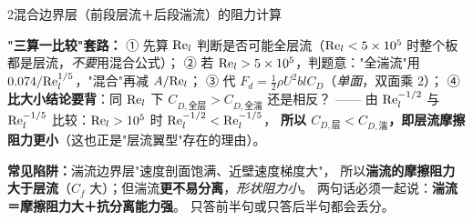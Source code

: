 \begin{kaodian}{2}{混合边界层（前段层流＋后段湍流）的阻力计算}
\begin{banfa}
\textbf{"三算一比较"套路：}
① 先算 $\mathrm{Re}_l$ 判断是否可能全层流（$\mathrm{Re}_l<5\times10^5$ 时整个板都是层流，\emph{不要}用混合公式）；
② 若 $\mathrm{Re}_l>5\times10^5$，判题意："全湍流"用 $0.074/\mathrm{Re}_l^{1/5}$，"混合"再减 $A/\mathrm{Re}_l$；
③ 代 $F_d=\frac12\rho U^2blC_D$（\emph{单面}，双面乘 2）；
④ \textbf{比大小结论要背}：同 $\mathrm{Re}_l$ 下 $C_{D,\text{全层}}>C_{D,\text{全湍}}$ 还是相反？
—— 由 $\mathrm{Re}_l^{-1/2}$ 与 $\mathrm{Re}_l^{-1/5}$ 比较：$\mathrm{Re}_l>10^5$ 时 $\mathrm{Re}_l^{-1/2}<\mathrm{Re}_l^{-1/5}$，
\textbf{所以 $C_{D,\text{层}}<C_{D,\text{湍}}$，即层流摩擦阻力更小}（这也正是"层流翼型"存在的理由）。
\end{banfa}

\begin{yicuo}
\textbf{常见陷阱：}湍流边界层"速度剖面饱满、近壁速度梯度大"，
所以\textbf{湍流的摩擦阻力大于层流}（$C_f$ 大）；但湍流\textbf{更不易分离}，\emph{形状阻力小}。
两句话必须一起说：\textbf{湍流＝摩擦阻力大＋抗分离能力强}。
只答前半句或只答后半句都会丢分。
\end{yicuo}
\end{kaodian}

